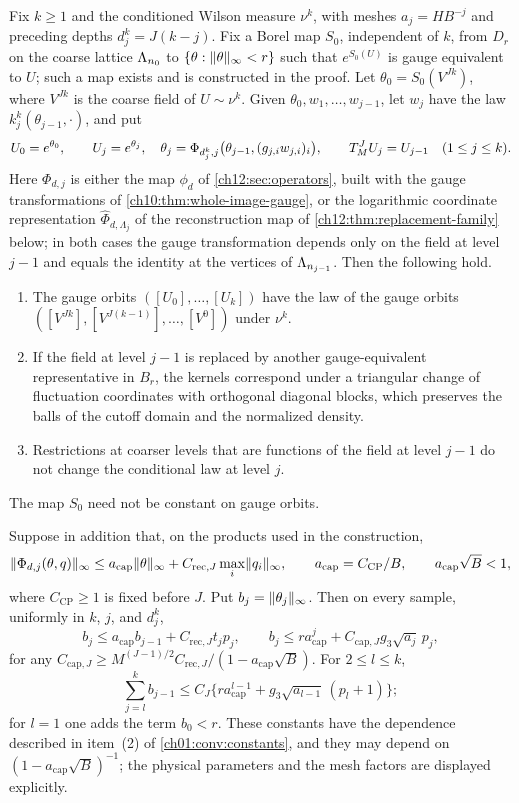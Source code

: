 \begin{lemma}\label{ch12:lem:backward-law}
Fix $k\ge1$ and the conditioned Wilson measure $\nu^k$, with meshes $a_j=HB^{-j}$ and preceding depths $d_j^k=J(k-j)$. Fix a Borel map $S_0$, independent of $k$, from $D_r$ on the coarse lattice $\Lambda_{n_0}$ to $\{\theta:\lVert \theta\rVert_\infty<r\}$ such that $e^{S_0(U)}$ is gauge equivalent to $U$; such a map exists and is constructed in the proof. Let $\theta_0=S_0(V^{Jk})$, where $V^{Jk}$ is the coarse field of $U\sim\nu^k$. Given $\theta_0,w_1,\ldots,w_{j-1}$, let $w_j$ have the law $k_j^k(\theta_{j-1},\cdot)$, and put
\[
 U_0=e^{\theta_0},\qquad
 U_j=e^{\theta_j},\quad \theta_j=\Phi_{d_j^k,j}\bigl(\theta_{j-1},(g_{j,i}w_{j,i})_i\bigr),
 \qquad T_M^J U_j=U_{j-1}\quad(1\le j\le k).
\]
Here $\Phi_{d,j}$ is either the map $\phi_d$ of \cref{ch12:sec:operators}, built with the gauge transformations of \cref{ch10:thm:whole-image-gauge}, or the logarithmic coordinate representation $\widehat\Phi_{d,\Lambda_j}$ of the reconstruction map of \cref{ch12:thm:replacement-family} below; in both cases the gauge transformation depends only on the field at level $j-1$ and equals the identity at the vertices of $\Lambda_{n_{j-1}}$. Then the following hold.
\begin{enumerate}
\item The gauge orbits $([U_0],\ldots,[U_k])$ have the law of the gauge orbits $([V^{Jk}],[V^{J(k-1)}],\ldots,[V^0])$ under $\nu^k$.
\item If the field at level $j-1$ is replaced by another gauge-equivalent representative in $B_r$, the kernels correspond under a triangular change of fluctuation coordinates with orthogonal diagonal blocks, which preserves the balls of the cutoff domain and the normalized density.
\item Restrictions at coarser levels that are functions of the field at level $j-1$ do not change the conditional law at level $j$.
\end{enumerate}
The map $S_0$ need not be constant on gauge orbits.

Suppose in addition that, on the products used in the construction,
\[
 \lVert \Phi_{d,j}(\theta,q)\rVert_\infty\le a_{\mathrm{cap}}\lVert \theta\rVert_\infty+C_{\mathrm{rec},J}\max_i\lVert q_i\rVert_\infty,
 \qquad a_{\mathrm{cap}}=C_{\mathrm{CP}}/B,\qquad a_{\mathrm{cap}}\sqrt B<1,
\]
where $C_{\mathrm{CP}}\ge1$ is fixed before $J$. Put $b_j=\lVert \theta_j\rVert_\infty$. Then on every sample, uniformly in $k$, $j$, and $d_j^k$,
\[
 b_j\le a_{\mathrm{cap}}b_{j-1}+C_{\mathrm{rec},J}t_jp_j,\qquad
 b_j\le ra_{\mathrm{cap}}^j+C_{\mathrm{cap},J}g_3\sqrt{a_j}\,p_j,
\]
for any $C_{\mathrm{cap},J}\ge M^{(J-1)/2}C_{\mathrm{rec},J}/(1-a_{\mathrm{cap}}\sqrt B)$. For $2\le l\le k$,
\[
 \sum_{j=l}^kb_{j-1}\le C_J\bigl\{ra_{\mathrm{cap}}^{l-1}+g_3\sqrt{a_{l-1}}\,(p_l+1)\bigr\};
\]
for $l=1$ one adds the term $b_0<r$. These constants have the dependence described in item~(2) of \cref{ch01:conv:constants}, and they may depend on $(1-a_{\mathrm{cap}}\sqrt B)^{-1}$; the physical parameters and the mesh factors are displayed explicitly.
\end{lemma}

